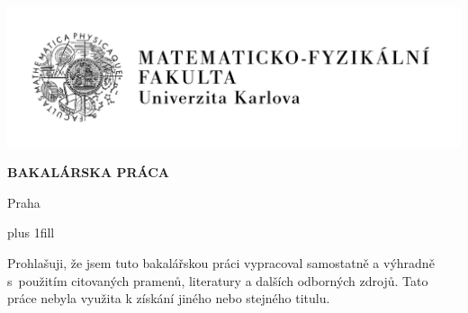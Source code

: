 

\pagestyle{empty}
\hypersetup{pageanchor=false}

\begin{center}

\centerline{\mbox{\includegraphics[width=166mm]{../img/logo-sk.pdf}}}

\vspace{-8mm}
\vfill

{\bf\Large BAKALÁRSKA PRÁCA}

\vfill

{\LARGE\AutorPrace}

\vspace{15mm}

{\LARGE\bfseries\NazevPrace}

\vfill

\Katedra

\vfill

{
\centerline{\vbox{}}}

\vfill

Praha \RokOdevzdani

\end{center}

\newpage



\openright
\hypersetup{pageanchor=true}
\pagestyle{plain}
\vglue 0pt plus 1fill

\noindent
Prohlašuji, že jsem tuto bakalářskou práci vypracoval samostatně a výhradně
s~použitím citovaných pramenů, literatury a dalších odborných zdrojů.
Tato práce nebyla využita k získání jiného nebo stejného titulu.

